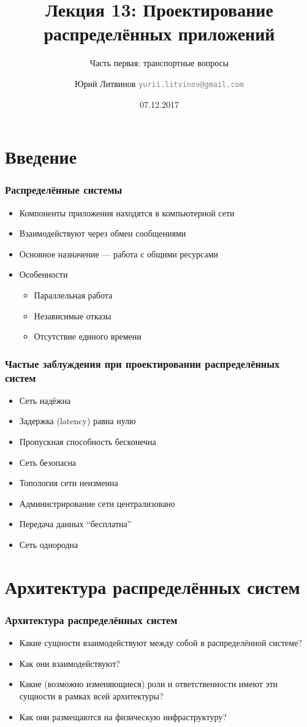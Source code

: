 \documentclass[xetex,mathserif,serif]{beamer}
\title{Лекция 13: Проектирование распределённых приложений}
\subtitle{Часть первая: транспортные вопросы}
\author[Юрий Литвинов]{Юрий Литвинов \newline \textcolor{gray}{\small\texttt{yurii.litvinov@gmail.com}}}
\date{07.12.2017}
\begin{document}
	
	\frame{\titlepage}

	\section{Введение}

	\begin{frame}
		\frametitle{Распределённые системы}
		\begin{itemize}
			\item Компоненты приложения находятся в компьютерной сети
			\item Взаимодействуют через обмен сообщениями
			\item Основное назначение --- работа с общими ресурсами
			\item Особенности
			\begin{itemize}
				\item Параллельная работа
				\item Независимые отказы
				\item Отсутствие единого времени
			\end{itemize}
		\end{itemize}
	\end{frame}

	\begin{frame}
		\frametitle{Частые заблуждения при проектировании распределённых систем}
		\begin{itemize}
			\item Сеть надёжна
			\item Задержка (latency) равна нулю
			\item Пропускная способность бесконечна
			\item Сеть безопасна
			\item Топология сети неизменна
			\item Администрирование сети централизовано
			\item Передача данных ``бесплатна''
			\item Сеть однородна
		\end{itemize}
	\end{frame}

	\section{Архитектура распределённых систем}

	\begin{frame}
		\frametitle{Архитектура распределённых систем}
		\begin{itemize}
			\item Какие сущности взаимодействуют между собой в распределённой системе?
			\item Как они взаимодействуют?
			\item Какие (возможно изменяющиеся) роли и ответственности имеют эти сущности в рамках всей архитектуры?
			\item Как они размещаются на физическую инфраструктуру?
		\end{itemize}
	\end{frame}
\end{document}
